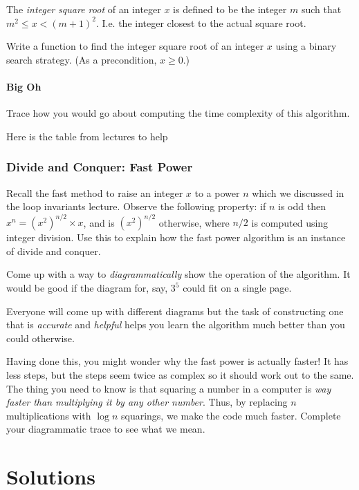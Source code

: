 \documentclass[twoside=false,DIV=14]{scrartcl}
\begin{document}
The \emph{integer square root} of an integer $x$ is defined to be the integer $m$ such that $m^2 \leq x < (m+1)^2$.  I.e. the integer closest to the actual square root.

Write a function to find the integer square root of an integer $x$
using a binary search strategy.
(As a precondition, $x \geq 0$.)
\subsection{Big Oh}
Trace how you would go about computing the time complexity of this algorithm.

\begin{hint}
  Here is the table from lectures to help
  
   
\end{hint}

\section{Divide and Conquer: Fast Power}

Recall the fast method to raise an integer $x$ to a power $n$ which we discussed in the loop invariants lecture. Observe the following property: if $n$ is odd then $x^n = (x^{2})^{n/2} \times x$, and is $(x^2)^{n/2}$ otherwise, where $n/2$ is computed using integer division.  Use this to explain how the fast power algorithm is an instance of divide and conquer.  

Come up with a way to \emph{diagrammatically} show the operation of the algorithm.  It would be good if the diagram for, say, $3^5$ could fit on a single page.

Everyone will come up with different diagrams but the task of constructing one that is \emph{accurate} and \emph{helpful} helps you learn the algorithm much better than you could otherwise.

Having done this, you might wonder why the fast power is actually faster!  It has less steps, but the steps seem twice as complex so it should work out to the same.  The thing you need to know is that squaring a number in a computer is \emph{way faster than multiplying it by any other number}. Thus, by replacing $n$ multiplications with $\log{n}$ squarings, we make the code much faster.  Complete your diagrammatic trace to see what we mean.

\newpage\setcounter{section}{0}
\part*{Solutions}
\end{document}
